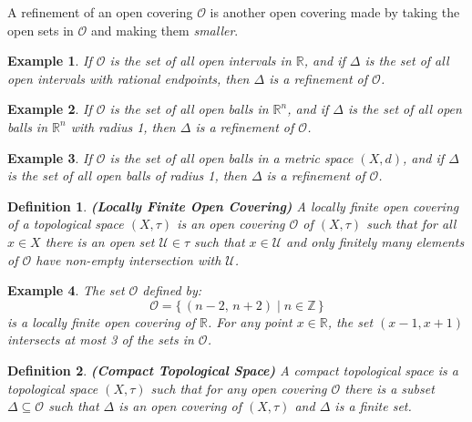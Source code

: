 \documentclass{article}
\theoremstyle{plain}
\theoremstyle{normal}
\newtheorem{definition}{Definition}[section]
\newtheorem{example}{Example}[section]
\begin{document}
        A refinement of an open covering $\mathcal{O}$ is another open covering
        made by taking the open sets in $\mathcal{O}$ and making them
        \textit{smaller}.
        \begin{example}
            If $\mathcal{O}$ is the set of all open intervals in $\mathbb{R}$,
            and if $\Delta$ is the set of all open intervals with rational
            endpoints, then $\Delta$ is a refinement of $\mathcal{O}$.
        \end{example}
        \begin{example}
            If $\mathcal{O}$ is the set of all open balls in $\mathbb{R}^{n}$,
            and if $\Delta$ is the set of all open balls in $\mathbb{R}^{n}$
            with radius 1, then $\Delta$ is a refinement of $\mathcal{O}$.
        \end{example}
        \begin{example}
            If $\mathcal{O}$ is the set of all open balls in a metric space
            $(X,d)$, and if $\Delta$ is the set of all open balls of radius 1,
            then $\Delta$ is a refinement of $\mathcal{O}$.
        \end{example}
        \begin{definition}{\textbf{(Locally Finite Open Covering)}}
            A locally finite open covering of a topological space $(X,\tau)$
            is an open covering $\mathcal{O}$ of $(X,\tau)$ such that for all
            $x\in{X}$ there is an open set $\mathcal{U}\in\tau$ such
            that $x\in\mathcal{U}$ and only finitely many elements of
            $\mathcal{O}$ have non-empty intersection with $\mathcal{U}$.
        \end{definition}
        \begin{example}
            The set $\mathcal{O}$ defined by:
            \begin{equation}
                \mathcal{O}=\{\,(n-2,\,n+2)\;|\;n\in\mathbb{Z}\,\}
            \end{equation}
            is a locally finite open covering of $\mathbb{R}$. For any point
            $x\in\mathbb{R}$, the set $(x-1,x+1)$ intersects at most 3 of the
            sets in $\mathcal{O}$.
        \end{example}
        \begin{definition}{\textbf{(Compact Topological Space)}}
            A compact topological space is a topological space $(X,\tau)$
            such that for any open covering $\mathcal{O}$ there is a subset
            $\Delta\subseteq\mathcal{O}$ such that $\Delta$ is an open covering
            of $(X,\tau)$ and $\Delta$ is a finite set.
        \end{definition}
\end{document}
